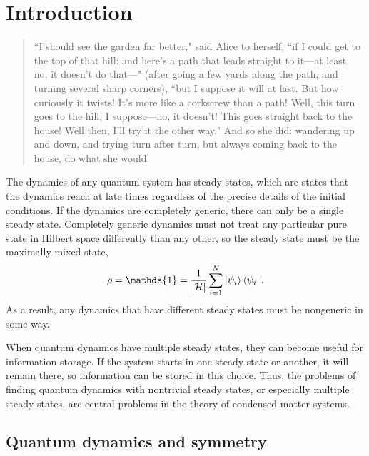 
\chapter{Introduction}
\label{chp:intro}

\begin{quotation}
	 ``I should see the garden far better," said Alice to herself, ``if I could get to the top of that hill: and here’s a path that leads straight to it—at least, no, it doesn’t do that—" (after going a few yards along the path, and turning several sharp corners), ``but I suppose it will at last. But how curiously it twists! It's more like a corkscrew than a path! Well, this turn goes to the hill, I suppose—no, it doesn't! This goes straight back to the house! Well then, I’ll try it the other way."
	And so she did: wandering up and down, and trying turn after turn, but always coming back to the house, do what she would. 
\end{quotation}

The dynamics of any quantum system has steady states, which are states that the dynamics reach at late times regardless of the precise details of the initial conditions. If the dynamics are completely generic, there can only be a single steady state. Completely generic dynamics must not treat any particular pure state in Hilbert space differently than any other, so the steady state must be the maximally mixed state,
\begin{align}
\rho = \mathds{1} = \frac{1}{|\mathcal{H}|} \sum_{i=1}^N \ket{\psi_i} \bra{\psi_i}.
\end{align}
As a result, any dynamics that have different steady states must be nongeneric in some way. 

When quantum dynamics have multiple steady states, they can become useful for information storage. If the system starts in one steady state or another, it will remain there, so information can be stored in this choice. Thus, the problems of finding quantum dynamics with nontrivial steady states, or especially multiple steady states, are central problems in the theory of condensed matter systems.


\section{Quantum dynamics and symmetry}

